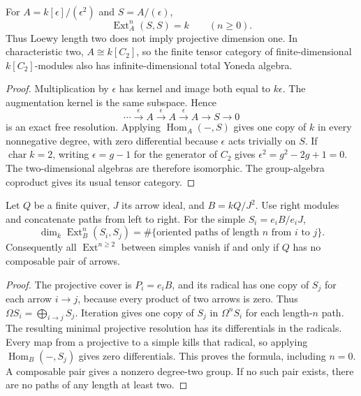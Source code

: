 \begin{proposition}
\label{v4-arith:wild:dual-numbers}
For \(A=k[\epsilon]/(\epsilon^2)\) and \(S=A/(\epsilon)\),
\[
 \operatorname{Ext}^n_A(S,S)=k\qquad(n\ge0).
\]
Thus Loewy length two does not imply projective dimension one.
In characteristic two, \(A\cong k[C_2]\), so the finite tensor category
of finite-dimensional \(k[C_2]\)-modules also has infinite-dimensional
total Yoneda algebra.
\end{proposition}
\begin{proof}
Multiplication by \(\epsilon\) has kernel and image both equal to
\(k\epsilon\). The augmentation kernel is the same subspace. Hence
\[
 \cdots\xrightarrow{\epsilon}A\xrightarrow{\epsilon}A
 \xrightarrow{\epsilon}A\longrightarrow S\longrightarrow0
\]
is an exact free resolution. Applying \(\operatorname{Hom}_A(-,S)\)
gives one copy of \(k\) in every nonnegative degree, with zero
differential because \(\epsilon\) acts trivially on \(S\).
If \(\operatorname{char}k=2\), writing \(\epsilon=g-1\) for the
generator of \(C_2\) gives \(\epsilon^2=g^2-2g+1=0\).
The two-dimensional algebras are therefore isomorphic.
The group-algebra coproduct gives its usual tensor category.
\end{proof}

\begin{proposition}
\label{v4-arith:wild:path-count}
Let \(Q\) be a finite quiver, \(J\) its arrow ideal, and
\(B=kQ/J^2\). Use right modules and concatenate paths from left to
right. For the simple \(S_i=e_iB/e_iJ\),
\[
 \dim_k\operatorname{Ext}^n_B(S_i,S_j)
 =\#\{\text{oriented paths of length }n\text{ from }i\text{ to }j\}.
\]
Consequently all \(\operatorname{Ext}^{n\ge2}\) between simples vanish
if and only if \(Q\) has no composable pair of arrows.
\end{proposition}
\begin{proof}
The projective cover is \(P_i=e_iB\), and its radical has one copy
of \(S_j\) for each arrow \(i\to j\), because every product of two
arrows is zero. Thus
\(\Omega S_i=\bigoplus_{i\to j}S_j\).
Iteration gives one copy of \(S_j\) in \(\Omega^nS_i\) for each
length-\(n\) path. The resulting minimal projective resolution has
its differentials in the radicals. Every map from a projective to a
simple kills that radical, so applying \(\operatorname{Hom}_B(-,S_j)\)
gives zero differentials. This proves the formula, including \(n=0\).
A composable pair gives a nonzero degree-two group. If no such pair
exists, there are no paths of any length at least two.
\end{proof}

